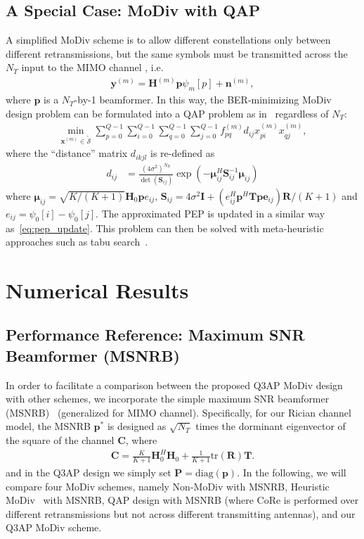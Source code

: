 \documentclass[journal,draftcls,onecolumn,12pt,twoside]{IEEEtran}
\begin{document}
\subsection{A Special Case: MoDiv with QAP}
A simplified MoDiv scheme is to allow different constellations only between
different retransmissions, but the same symbols must be transmitted across the
$N_T$ input to the MIMO channel , i.e.
\begin{align}
  \mathbf{y}^{(m)} = \mathbf{H}^{(m)}\mathbf{p} \psi_m[p] +
  \mathbf{n}^{(m)},
\end{align}
where $\mathbf{p}$ is a $N_T$-by-1 beamformer. In this way, the BER-minimizing
MoDiv design problem can be formulated into a QAP problem as
in~\cite{wu2016modulation} regardless of $N_T$:
\begin{align}
  \min_{\mathbf{x}^{(m)}\in \tilde{\mathcal{S}}}
  \sum_{p=0}^{Q-1}\sum_{i=0}^{Q-1}\sum_{q=0}^{Q-1}
  \sum_{j=0}^{Q-1}
  f_{pq}^{(m)}d_{ij}x_{pi}^{(m)}x_{qj}^{(m)},
  \label{eq:SQAP}
\end{align}
where the ``distance'' matrix $d_{ikjl}$ is re-defined as
\begin{align}
  d_{ij} & = \frac{(4\sigma^2)^{N_R}}{\det(\mathbf{S}_{ij})}
      \exp\left(-\bm{\mu}_{ij}^H\mathbf{S}_{ij}^{-1}\bm{\mu}_{ij}\right)
\end{align}
where $\bm{\mu}_{ij} = \sqrt{K/(K+1)}\mathbf{H}_0\mathbf{p}e_{ij}$,
$\mathbf{S}_{ij} = 4\sigma^2\mathbf{I} + (e_{ij}^H\mathbf{p}^H \mathbf{T}
\mathbf{p}\mathbf{e}_{ij})\mathbf{R} / (K+1)$
and $e_{ij} = \psi_0[i] - \psi_0[j]$. The approximated PEP is updated
in a similar way as~\eqref{eq:pep_update}. This problem can then be solved with
meta-heuristic approaches such as tabu search~\cite{taillard1991robust}.

\section{Numerical Results}
\label{sec:numerical}

\subsection{Performance Reference: Maximum SNR
Beamformer (MSNRB)}
In order to facilitate a comparison between the proposed Q3AP
MoDiv design with other schemes, we incorporate the simple maximum SNR
beamformer (MSNRB)~\cite{barriac2006space} (generalized for MIMO channel).
Specifically, for our Rician channel model, the MSNRB $\mathbf{p}^*$ is designed
as $\sqrt{N_T}$ times the dorminant eigenvector of the
square of the channel $\mathbf{C}$, where
\begin{align}
  \mathbf{C} = \frac{K}{K+1}\mathbf{H}_0^H\mathbf{H}_0+
  \frac{1}{K+1} \mbox{tr}(\mathbf{R})\mathbf{T}.
\end{align}
and in the Q3AP design we simply set $\mathbf{P} = \mbox{diag}(\mathbf{p})$. In
the following, we will compare four MoDiv schemes, namely Non-MoDiv with MSNRB,
Heuristic MoDiv~\cite{panasonic2001enhanced} with MSNRB, QAP design with MSNRB
(where CoRe is performed over different retransmissions but not across different
transmitting antennas), and our Q3AP MoDiv scheme.
\end{document}
